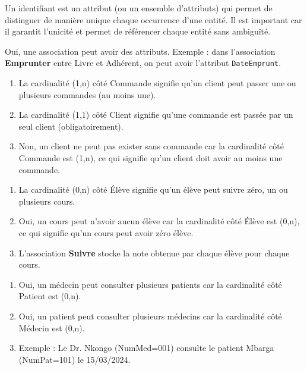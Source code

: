 Un identifiant est un attribut (ou un ensemble d'attributs) qui permet de distinguer de manière unique chaque occurrence d'une entité. Il est important car il garantit l'unicité et permet de référencer chaque entité sans ambiguïté.

Oui, une association peut avoir des attributs. Exemple : dans l'association \textbf{Emprunter} entre Livre et Adhérent, on peut avoir l'attribut \texttt{DateEmprunt}.

\begin{enumerate}
    \item La cardinalité (1,n) côté Commande signifie qu'un client peut passer une ou plusieurs commandes (au moins une).
    \item La cardinalité (1,1) côté Client signifie qu'une commande est passée par un seul client (obligatoirement).
    \item Non, un client ne peut pas exister sans commande car la cardinalité côté Commande est (1,n), ce qui signifie qu'un client doit avoir au moins une commande.
\end{enumerate}

\begin{enumerate}
    \item La cardinalité (0,n) côté Élève signifie qu'un élève peut suivre zéro, un ou plusieurs cours.
    \item Oui, un cours peut n'avoir aucun élève car la cardinalité côté Élève est (0,n), ce qui signifie qu'un cours peut avoir zéro élève.
    \item L'association \textbf{Suivre} stocke la note obtenue par chaque élève pour chaque cours.
\end{enumerate}

\begin{enumerate}
    \item Oui, un médecin peut consulter plusieurs patients car la cardinalité côté Patient est (0,n).
    \item Oui, un patient peut consulter plusieurs médecins car la cardinalité côté Médecin est (0,n).
    \item Exemple : Le Dr. Nkongo (NumMed=001) consulte le patient Mbarga (NumPat=101) le 15/03/2024.
\end{enumerate}

